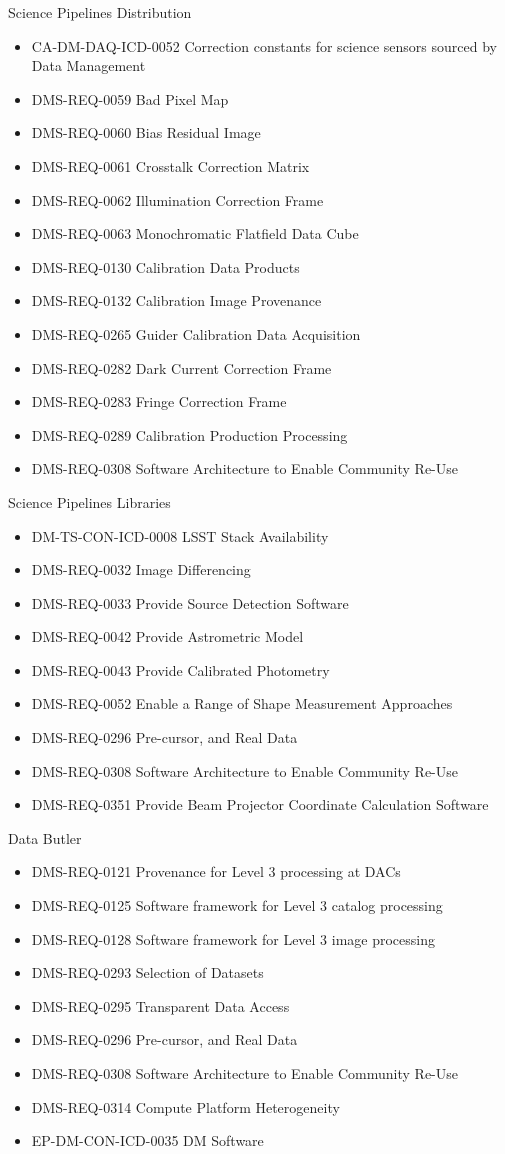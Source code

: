 Science Pipelines Distribution \begin{itemize}
\item CA-DM-DAQ-ICD-0052 Correction constants for science sensors sourced by Data Management
\item DMS-REQ-0059 Bad Pixel Map
\item DMS-REQ-0060 Bias Residual Image
\item DMS-REQ-0061 Crosstalk Correction Matrix
\item DMS-REQ-0062 Illumination Correction Frame
\item DMS-REQ-0063 Monochromatic Flatfield Data Cube
\item DMS-REQ-0130 Calibration Data Products
\item DMS-REQ-0132 Calibration Image Provenance
\item DMS-REQ-0265 Guider Calibration Data Acquisition
\item DMS-REQ-0282 Dark Current Correction Frame
\item DMS-REQ-0283 Fringe Correction Frame
\item DMS-REQ-0289 Calibration Production Processing
\item DMS-REQ-0308 Software Architecture to Enable Community Re-Use
\end{itemize}
Science Pipelines Libraries \begin{itemize}
\item DM-TS-CON-ICD-0008 LSST Stack Availability
\item DMS-REQ-0032 Image Differencing
\item DMS-REQ-0033 Provide Source Detection Software
\item DMS-REQ-0042 Provide Astrometric Model
\item DMS-REQ-0043 Provide Calibrated Photometry
\item DMS-REQ-0052 Enable a Range of Shape Measurement Approaches
\item DMS-REQ-0296 Pre-cursor, and Real Data
\item DMS-REQ-0308 Software Architecture to Enable Community Re-Use
\item DMS-REQ-0351 Provide Beam Projector Coordinate Calculation Software
\end{itemize}
Data Butler \begin{itemize}
\item DMS-REQ-0121 Provenance for Level 3 processing at DACs
\item DMS-REQ-0125 Software framework for Level 3 catalog processing
\item DMS-REQ-0128 Software framework for Level 3 image processing
\item DMS-REQ-0293 Selection of Datasets
\item DMS-REQ-0295 Transparent Data Access
\item DMS-REQ-0296 Pre-cursor, and Real Data
\item DMS-REQ-0308 Software Architecture to Enable Community Re-Use
\item DMS-REQ-0314 Compute Platform Heterogeneity
\item EP-DM-CON-ICD-0035 DM Software
\end{itemize}
